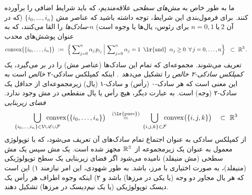 ما به طور خاص به \emph{مش‌های سطحی} علاقه‌مندیم، که باید شرایط اضافی را برآورده کنند.
برای فرمول‌بندی این شرایط، توجه داشته باشید که عناصر مش $\{ i_0, \dots, i_n \}$
(که در آن $n=0,1\ \text{یا}\ 2$ برای رئوس، یال‌ها یا وجوه است)
$n$-\emph{سادک‌ها} را القا می‌کنند، که به عنوان پوشش‌های محدب
\begin{align}
    \operatorname{convex} \!\big(\{ i_0, \dots, i_n \}\big)\ :=\ 
    \Big\{ \sum\nolimits_{j=0}^n \alpha_j\mkern2mu p_{i_j} \,\Big|\, 
    \sum\nolimits_{j=0}^n \alpha_j = 1\,\ \textup{\lr{and}}\,\ \alpha_j\geq0\,\ \forall\,j=0,\dots,n \Big\}
    \ \ \subset\ \R^3 \,.
\end{align}
تعریف می‌شوند. مجموعه‌ای که تمام این سادک‌ها (عناصر مش) را در بر می‌گیرد، یک \emph{کمپلکس سادکی-۲ خالص} را تشکیل می‌دهد~\cite{desbrun2005DiscreteExteriorCalculus,craneDiscreteDifferentialGeometry2014}.
اینکه کمپلکس سادکی-۲ \emph{خالص} است به این معنی است که هر سادک-۰ (رأس) و سادک-۱ (یال) زیرمجموعه‌ای از حداقل یک سادک-۲ (وجه) است.
به عبارت دیگر، هیچ رأس یا یال منقطعی در مش وجود ندارد.
\emph{فضای زیربنایی}
\begin{align}
    \bigcup_{\{ i_0, \dots, i_n \} \in \mathcal{V} \cup \mathcal{E} \cup \mathcal{F}}
    \mkern-40mu
    \operatorname{convex} \!\big( \{ i_0, \dots, i_n \}\big)
    \ \ \overset{\textup{(\lr{pure})}}{=}\,
    \bigcup_{\{i,j,k\} \in \mathcal{F}}
    \mkern-10mu
    \operatorname{convex} \!\big( \{i,j,k\}\big)
    \ \ \ \subset\ \R^3
\end{align}
از کمپلکس سادکی به عنوان اجتماع تمام سادک‌های آن تعریف می‌شود، که با توپولوژی معمول به عنوان یک زیرمجموعه از~$\mathbb{R}^3$ مجهز شده است.
یک مش سپس یک مش سطحی (مش منیفلد) نامیده می‌شود اگر فضای زیربنایی یک سطح توپولوژیکی (منیفلد)، به صورت اختیاری با مرز، باشد.
به طور شهودی، این امر نیازمند
۱) این است که هر یال مجاور دو وجه (یا یکی در مرزها) باشد و
۲) اینکه وجوه اطراف هر رأس یک دیسک توپولوژیکی (یا یک نیم‌دیسک در مرزها) تشکیل دهند.


